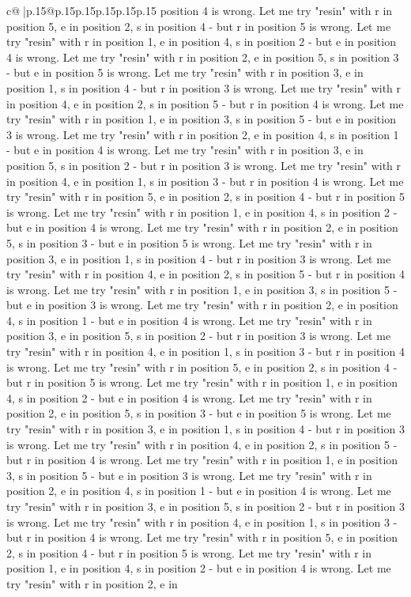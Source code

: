 \documentclass{article}
\begin{document}
{\begin{supertabular}{c@{$\;$}|p{.15\linewidth}@{}p{.15\linewidth}p{.15\linewidth}p{.15\linewidth}p{.15\linewidth}p{.15\linewidth}}
{{{position 4 is wrong. Let me try "resin" with r in position 5, e in position 2, s in position 4 {-} but r in position 5 is wrong. Let me try "resin" with r in position 1, e in position 4, s in position 2 {-} but e in position 4 is wrong. Let me try "resin" with r in position 2, e in position 5, s in position 3 {-} but e in position 5 is wrong. Let me try "resin" with r in position 3, e in position 1, s in position 4 {-} but r in position 3 is wrong. Let me try "resin" with r in position 4, e in position 2, s in position 5 {-} but r in position 4 is wrong. Let me try "resin" with r in position 1, e in position 3, s in position 5 {-} but e in position 3 is wrong. Let me try "resin" with r in position 2, e in position 4, s in position 1 {-} but e in position 4 is wrong. Let me try "resin" with r in position 3, e in position 5, s in position 2 {-} but r in position 3 is wrong. Let me try "resin" with r in position 4, e in position 1, s in position 3 {-} but r in position 4 is wrong. Let me try "resin" with r in position 5, e in position 2, s in position 4 {-} but r in position 5 is wrong. Let me try "resin" with r in position 1, e in position 4, s in position 2 {-} but e in position 4 is wrong. Let me try "resin" with r in position 2, e in position 5, s in position 3 {-} but e in position 5 is wrong. Let me try "resin" with r in position 3, e in position 1, s in position 4 {-} but r in position 3 is wrong. Let me try "resin" with r in position 4, e in position 2, s in position 5 {-} but r in position 4 is wrong. Let me try "resin" with r in position 1, e in position 3, s in position 5 {-} but e in position 3 is wrong. Let me try "resin" with r in position 2, e in position 4, s in position 1 {-} but e in position 4 is wrong. Let me try "resin" with r in position 3, e in position 5, s in position 2 {-} but r in position 3 is wrong. Let me try "resin" with r in position 4, e in position 1, s in position 3 {-} but r in position 4 is wrong. Let me try "resin" with r in position 5, e in position 2, s in position 4 {-} but r in position 5 is wrong. Let me try "resin" with r in position 1, e in position 4, s in position 2 {-} but e in position 4 is wrong. Let me try "resin" with r in position 2, e in position 5, s in position 3 {-} but e in position 5 is wrong. Let me try "resin" with r in position 3, e in position 1, s in position 4 {-} but r in position 3 is wrong. Let me try "resin" with r in position 4, e in position 2, s in position 5 {-} but r in position 4 is wrong. Let me try "resin" with r in position 1, e in position 3, s in position 5 {-} but e in position 3 is wrong. Let me try "resin" with r in position 2, e in position 4, s in position 1 {-} but e in position 4 is wrong. Let me try "resin" with r in position 3, e in position 5, s in position 2 {-} but r in position 3 is wrong. Let me try "resin" with r in position 4, e in position 1, s in position 3 {-} but r in position 4 is wrong. Let me try "resin" with r in position 5, e in position 2, s in position 4 {-} but r in position 5 is wrong. Let me try "resin" with r in position 1, e in position 4, s in position 2 {-} but e in position 4 is wrong. Let me try "resin" with r in position 2, e in }}}
\end{supertabular}}
\end{document}
